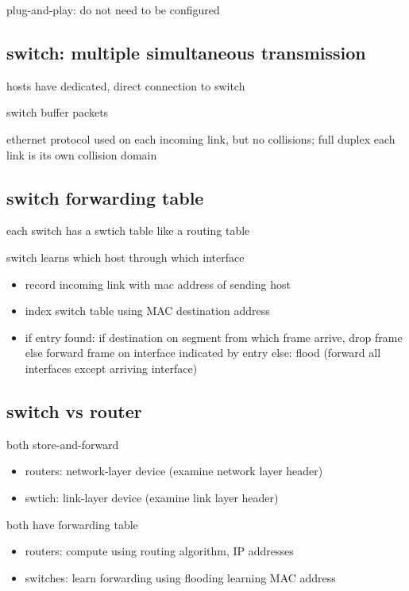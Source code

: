 \documentclass[10pt]{article}
\theoremstyle{break}
\begin{document}
plug-and-play: do not need to be configured
\subsection{switch: multiple simultaneous transmission}
hosts have dedicated, direct connection to switch 

switch buffer packets 

ethernet protocol used on each incoming link, but no collisions; full duplex each link is its own collision domain  

\subsection{switch forwarding table}
each switch has a swtich table like a routing table 

switch learns which host through which interface

\begin{itemize}
    \item record incoming link with mac address of sending host 
    \item index switch table using MAC destination address 
    \item if entry found: {if destination on segment from which frame arrive, drop frame 
        else forward frame on interface indicated by entry }
          else: flood (forward all interfaces except arriving interface)
\end{itemize}

\subsection{switch vs router}
both store-and-forward 
\begin{itemize}
    \item routers: network-layer device (examine network layer header)
    \item swtich: link-layer device (examine link layer header)
\end{itemize}

both have forwarding table
\begin{itemize}
    \item routers: compute using routing algorithm, IP addresses
    \item switches: learn forwarding using flooding learning MAC address
\end{itemize}
\end{document}
